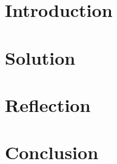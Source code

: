 \documentclass[notitlepage]{article}
\begin{document}


\newpage

\section{Introduction}



\section{Solution}



\section{Reflection}



\section{Conclusion}


\end{document}
